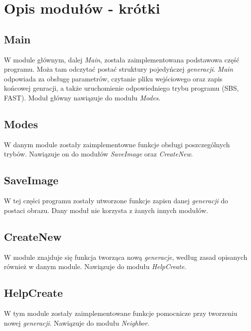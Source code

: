 \documentclass[a4paper]{article}
\begin{document}
\section{Opis modu\l{}\'ow - kr\'otki}

\subsection{Main}

\quad W module g\l{}\'ownym, dalej \textit{Main}, zosta\l{}a zaimplementowana podstawowa cz\k{e}\'s\'c programu. 
Mo\.za tam odczyta\'c posta\'c struktury pojedy\'nczej \textit{generacji}. 
\textit{Main} odpowiada za obs\l{}ug\k{e} parametr\'ow, czytanie pliku wej\'sciowego oraz zapis ko\'ncowej genracji, a tak\.ze uruchomienie odpowiedniego trybu programu (SBS, FAST). 
Modu\l{} g\l{}\'owny nawi\k{a}zuje do modu\l{}u \textit{Modes}.  

\subsection{Modes}

\quad W danym module zosta\l{}y zaimplementowne funkcje obs\l{}ugi poszczeg\'olnych tryb\'ow. 
Nawi\k{a}zuje on do modu\l{}\'ow \textit{SaveImage} oraz \textit{CreateNew}. 

\subsection{SaveImage}

\quad W tej cz\k{e}\'sci programu zosta\l{}y utworzone funkcje zapisu danej \textit{generacji} do postaci obrazu. 
Dany modu\l{} nie korzysta z \.zanych innych modu\l{}\'ow.

\subsection{CreateNew}

\quad W module znajduje si\k{e} funkcja tworz\k{a}ca now\k{a} \textit{generacje}, wed\l{}ug zasad opisanych r\'ownie\.z w danym module.
Nawi\k{a}zuje do modu\l{}u \textit{HelpCreate}.

\subsection{HelpCreate}

\quad W tym module zosta\l{}y zaimplementowane funkcje pomocnicze przy tworzeniu nowej \textit{generacji}.
Nawi\k{a}zuje do modu\l{}u \textit{Neighbor}.
\end{document}
